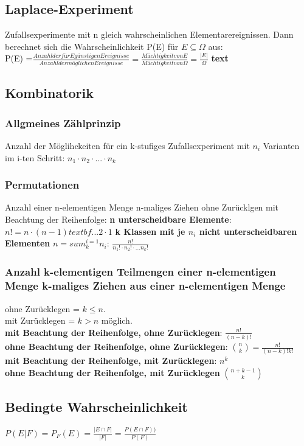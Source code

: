   \subsection{Laplace-Experiment}
  Zufallsexperimente mit n gleich wahrscheinlichen Elementarereignissen. Dann berechnet sich die Wahrscheinlichkeit P(E) für $E \subseteq \Omega$ aus:\\
  P(E) =$\frac{Anzahl der für E günstigen Ereignisse}{Anzahl der möglichen Ereignisse} = \frac{Mächtigkeit von E}{Mächtigkeit von \Omega} = \frac{|E|}{\Omega}$
  \textbf{text}
  \subsection{Kombinatorik}
  \subsubsection{Allgmeines Zählprinzip}
  Anzahl der Möglihckeiten für ein k-stufiges Zufallsexperiment mit $n_{i}$ Varianten im i-ten Schritt:
  $n_{1} \cdot n_{2} \cdot \text{...} \cdot n_{k}$
  \subsubsection{Permutationen}
  Anzahl einer n-elementigen Menge n-maliges Ziehen ohne Zurücklgen mit Beachtung der Reihenfolge: \textbf{n unterscheidbare Elemente}: $n! = n \cdot(n-1) textbf{...} 2 \cdot 1$
  \textbf{k Klassen mit je $n_{i}$ nicht unterscheidbaren Elementen} $n = sum_{k }^{i=1} n_{i}$:
  $\frac{n!}{n_{1}! \cdot n_{2}!\cdot \text{...}n_{k}! }$
  \subsubsection{Anzahl k-elementigen Teilmengen einer n-elementigen Menge k-maliges Ziehen aus einer n-elementigen Menge}
  ohne Zurücklegen = $k\le n$.\\
  mit Zurücklegen = $ k > n$ möglich.\\
  \textbf{mit Beachtung der Reihenfolge, ohne Zurücklegen}: $\frac{n!}{(n-k)!}$\\
  \textbf{ohne Beachtung  der Reihenfolge, ohne Zurücklegen}: $\binom{n}{k} = \frac{n!}{(n-k)! k!}$\\
  \textbf{mit Beachtung der Reihenfolge, mit Zurücklegen}: $n^k$\\
  \textbf{ohne Beachtung der Reihenfolge, mit Zurücklegen} $\binom{n+k-1}{k}$
  \subsection{Bedingte Wahrscheinlichkeit}
  $P(E|F) = P_{F}(E) = \frac{|E \cap F| }{|F|} = \frac{P(E\cap F))}{P(F)}$
